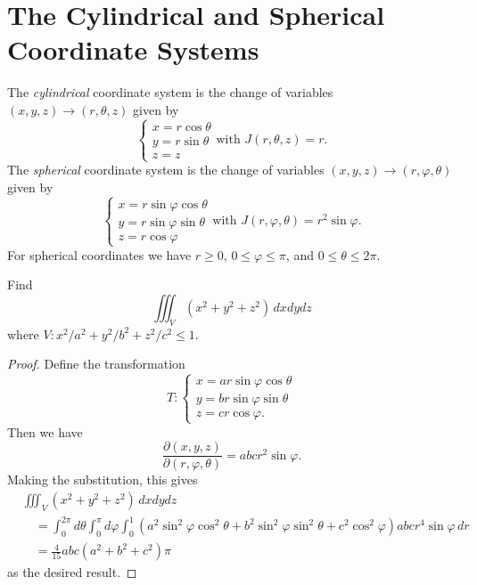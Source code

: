\section{The Cylindrical and Spherical Coordinate Systems}
The \emph{cylindrical} coordinate system is the change of
variables $(x, y, z) \to (r, \theta, z)$ given by
\[
  \begin{cases}
    x = r \cos \theta \\
    y = r \sin \theta \\
    z = z
  \end{cases}
  \text{with } J(r, \theta, z) = r.
\]
The \emph{spherical} coordinate system is the change of
variables $(x, y, z) \to (r, \varphi, \theta)$ given by
\[
\begin{cases}
  x = r \sin \varphi \cos \theta \\
  y = r \sin \varphi \sin \theta \\
  z = r \cos \varphi
\end{cases}
\text{with } J(r, \varphi, \theta) = r^2 \sin \varphi.
\]
For spherical coordinates we have
$r \ge 0$, $0 \le \varphi \le \pi$, and
$0 \le \theta \le 2\pi$.

\begin{example}
  Find
  \[
    \iiint_V (x^2 + y^2 + z^2)\, dx dy dz
  \]
  where $V : x^2 / a^2 + y^2 / b^2 + z^2 / c^2 \le 1$.
\end{example}

\begin{proof}
  Define the transformation
  \[
    T :
    \begin{cases}
      x = a r \sin \varphi \cos \theta \\
      y = b r \sin \varphi \sin \theta \\
      z = c r \cos \varphi.
    \end{cases}
  \]
  Then we have
  \[
    \frac{\partial(x, y, z)}{\partial(r, \varphi, \theta)}
    = abc r^2 \sin \varphi.
  \]
  Making the substitution, this gives
  \begin{align*}
    &\iiint_V (x^2 + y^2 + z^2)\, dx dy dz \\
    &\quad = \int_0^{2\pi} d\theta \int_0^\pi d\varphi \int_0^1 (a^2 \sin^2 \varphi \cos^2 \theta + b^2 \sin^2 \varphi \sin^2 \theta + c^2 \cos^2 \varphi) abc r^4 \sin \varphi\, dr \\
    &\quad = \frac{4}{15} abc(a^2 + b^2 + c^2) \pi
  \end{align*}
  as the desired result.
\end{proof}

